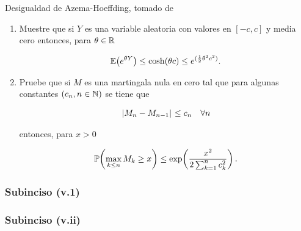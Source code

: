 Desigualdad de Azema-Hoeffding, tomado de \par
\cite[E14.2, p.237]{MR1155402}\par\null

\begin{enumerate}
    \item[(v.i)]    [\ref{problema2_3:subinciso5_1}]
         Muestre que si $Y$ es una variable aleatoria con valores en $[-c,c]$ y media cero entonces, para $\theta\in\mathbb{R}$
        
        \begin{align}
            \mathbb{E}\! \left( e^{\theta Y} \right) \leq \cosh(\theta c)\leq e^{(\frac{1}{2}\theta^2c^2)}. 
        \end{align}\par\null

    \item[(v.ii)]    [\ref{problema2_3:subinciso5_2}]
        Pruebe que si $M$ es una martingala nula en cero tal que para algunas constantes $\left( c_n,n\in\mathbb{N}\right) $ se tiene que
        
        \begin{align}
            \hspace{.25mm}\left|M_n-M_{n-1}\right|\hspace{.25mm}\leq c_n\quad\forall n
        \end{align}
        
        entonces, para $x>0$
        
        \begin{align}
            \mathbb{P}\! \left( \max_{k\leq n} M_k\geq x \right)\leq \exp\!\left( \frac{x^2}{2\sum_{k=1}^n c_k^2}\right) .
        \end{align}
\end{enumerate}
    
\subsubsection{Subinciso (v.1)}     \label{problema2_3:subinciso5_1}
    
    \newpage
    
\subsubsection{Subinciso (v.ii)}    \label{problema2_3:subinciso5_2} 
    

